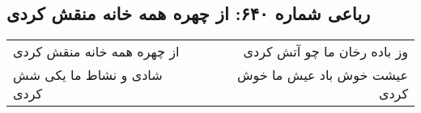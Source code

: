 \begin{center}
\section*{رباعی شماره ۶۴۰: از چهره همه خانه منقش کردی}
\label{sec:sh640}
\begin{longtable}{l p{0.5cm} r}
از چهره همه خانه منقش کردی
&&
وز باده رخان ما چو آتش کردی
\\
شادی و نشاط ما یکی شش کردی
&&
عیشت خوش باد عیش ما خوش کردی
\\
\end{longtable}
\end{center}
